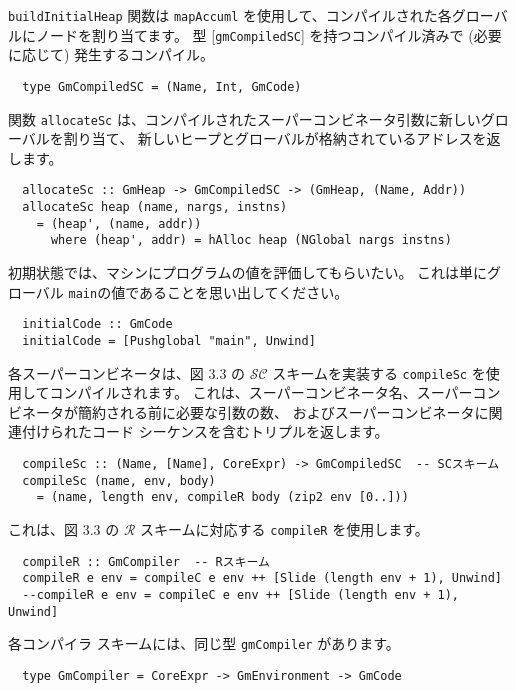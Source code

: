 \documentclass{jarticle}
\begin{document}
\texttt{buildInitialHeap} 関数は \texttt{mapAccuml} を使用して、コンパイルされた各グローバルにノードを割り当てます。
型 [\texttt{gmCompiledSC}] を持つコンパイル済みで (必要に応じて) 発生するコンパイル。

\begin{verbatim}
  type GmCompiledSC = (Name, Int, GmCode)
\end{verbatim}

関数 \texttt{allocateSc} は、コンパイルされたスーパーコンビネータ引数に新しいグローバルを割り当て、
新しいヒープとグローバルが格納されているアドレスを返します。

\begin{verbatim}
  allocateSc :: GmHeap -> GmCompiledSC -> (GmHeap, (Name, Addr))
  allocateSc heap (name, nargs, instns)
    = (heap', (name, addr))
      where (heap', addr) = hAlloc heap (NGlobal nargs instns)
\end{verbatim}

初期状態では、マシンにプログラムの値を評価してもらいたい。
これは単にグローバル \texttt{main}の値であることを思い出してください。

\begin{verbatim}
  initialCode :: GmCode
  initialCode = [Pushglobal "main", Unwind]
\end{verbatim}

各スーパーコンビネータは、図 3.3 の $\mathcal{SC}$ スキームを実装する \texttt{compileSc} を使用してコンパイルされます。
これは、スーパーコンビネータ名、スーパーコンビネータが簡約される前に必要な引数の数、
およびスーパーコンビネータに関連付けられたコード シーケンスを含むトリプルを返します。

\begin{verbatim}
  compileSc :: (Name, [Name], CoreExpr) -> GmCompiledSC  -- SCスキーム
  compileSc (name, env, body)
    = (name, length env, compileR body (zip2 env [0..]))
\end{verbatim}

これは、図 3.3 の $\mathcal{R}$ スキームに対応する \texttt{compileR} を使用します。

\begin{verbatim}
  compileR :: GmCompiler  -- Rスキーム
  compileR e env = compileC e env ++ [Slide (length env + 1), Unwind]
  --compileR e env = compileC e env ++ [Slide (length env + 1), Unwind]
\end{verbatim}

各コンパイラ スキームには、同じ型 \texttt{gmCompiler} があります。

\begin{verbatim}
  type GmCompiler = CoreExpr -> GmEnvironment -> GmCode
\end{verbatim}
\end{document}
